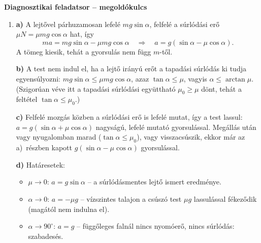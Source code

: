 \documentclass[11pt,a4paper]{article}
\begin{document}
\begin{center}
{\large\bfseries Diagnosztikai feladatsor -- megoldókulcs}
\end{center}

\begin{enumerate}[leftmargin=*,label=\textbf{\arabic*.},itemsep=9pt,topsep=0pt,parsep=0pt]

\item \textbf{a)} A lejtővel párhuzamosan lefelé $mg\sin\alpha$, felfelé a súrlódási erő
$\mu N = \mu mg\cos\alpha$ hat, így
\[
  ma = mg\sin\alpha - \mu mg\cos\alpha
  \quad\Longrightarrow\quad
  a = g(\sin\alpha - \mu\cos\alpha).
\]
A tömeg kiesik, tehát a gyorsulás nem függ $m$-től.

\textbf{b)} A test nem indul el, ha a lejtő irányú erőt a tapadási súrlódás ki tudja
egyensúlyozni: $mg\sin\alpha \le \mu mg\cos\alpha$, azaz $\tan\alpha \le \mu$, vagyis
$\alpha \le \arctan\mu$. (Szigorúan véve itt a tapadási súrlódási együttható
$\mu_0 \ge \mu$ dönt, tehát a feltétel $\tan\alpha \le \mu_0$.)

\textbf{c)} Felfelé mozgás közben a súrlódási erő is lefelé mutat, így a test lassul:
$a = g(\sin\alpha + \mu\cos\alpha)$ nagyságú, lefelé mutató gyorsulással. Megállás után
vagy nyugalomban marad ($\tan\alpha \le \mu_0$), vagy visszacsúszik, ekkor már az
a)~részben kapott $g(\sin\alpha - \mu\cos\alpha)$ gyorsulással.

\textbf{d)} Határesetek:
\begin{itemize}[nosep,leftmargin=1.5em]
  \item $\mu\to 0$: $a = g\sin\alpha$ -- a súrlódásmentes lejtő ismert eredménye.
  \item $\alpha\to 0$: $a = -\mu g$ -- vízszintes talajon a csúszó test $\mu g$
    lassulással fékeződik (magától nem indulna el).
  \item $\alpha\to 90^\circ$: $a = g$ -- függőleges falnál nincs nyomóerő, nincs
    súrlódás: szabadesés.
\end{itemize}


\end{enumerate}
\end{document}
